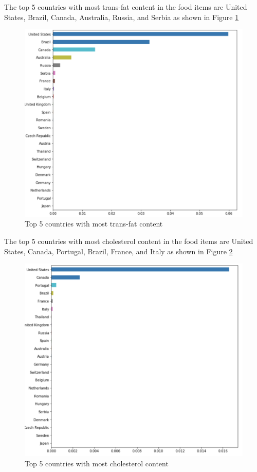 \documentclass[sigconf]{acmart}
\begin{document}
    
The top 5 countries with most trans-fat content in the food items are United States, Brazil, Canada, Australia, Russia, and Serbia as shown in Figure \ref{fig:Fig10} \\
	
\begin{figure}
\includegraphics[width=1.0\textwidth]{images/fig10.png}
\caption{Top 5 countries with most trans-fat content \cite{code-base}}
\label{fig:Fig10}
\end{figure}
        
The top 5 countries with most cholesterol content in the food items are United States, Canada, Portugal, Brazil, France, and Italy as shown in Figure \ref{fig:Fig11} \\
	
\begin{figure}
\includegraphics[width=1.0\textwidth]{images/fig11.png}
\caption{Top 5 countries with most cholesterol content \cite{code-base}}
\label{fig:Fig11}
\end{figure}
\end{document}

